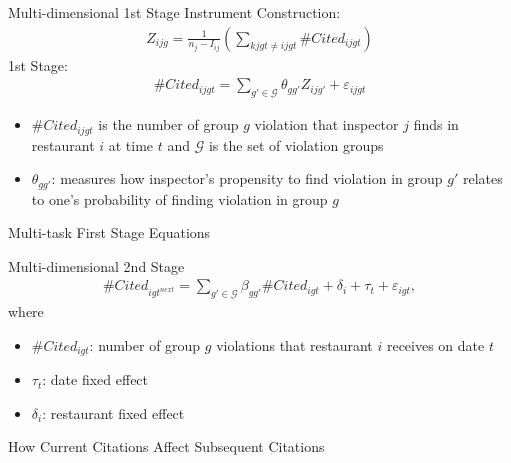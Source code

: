 \documentclass[handout]{beamer}
\begin{document}
\begin{frame}{Multi-dimensional 1st Stage}
    Instrument Construction:
    \begin{align*}
        Z_{ijg} = \frac{1}{n_j - I_{ij}} \left(\sum_{kjgt \neq ijgt} \# Cited_{ijgt}\right)
    \end{align*}
    \pause
    1st Stage:
    \begin{align*}
        \# Cited_{ijgt} = \sum_{g'\in \mathcal{G}} \theta_{gg'}Z_{ijg'} + \varepsilon_{ijgt} 
    \end{align*}
    \begin{itemize}
    \item $\# Cited_{ijgt}$ is the number of group $g$ violation that inspector $j$ finds in restaurant $i$ at time $t$ and $\mathcal{G}$ is the set of violation groups
    \item $\theta_{gg'}$: measures how inspector's propensity to find violation in group $g'$ relates to one's probability of finding violation in group $g$ 
    \end{itemize}
\end{frame}

\begin{frame}{Multi-task First Stage Equations}
\begin{table}[]
\scalebox{0.4}{
}
\end{table}
\end{frame}

\begin{frame}{Multi-dimensional 2nd Stage}
\begin{align*}
    \# Cited_{igt^{next}} = \sum_{g' \in \mathcal{G}} \beta_{gg'} \# Cited_{igt} + \delta_i + \tau_t + \varepsilon_{igt},
\end{align*}
where 
\begin{itemize}
\item $\# Cited_{igt}$: number of group $g$ violations that restaurant $i$ receives on date $t$
\item $\tau_t$: date fixed effect
\item $\delta_i$: restaurant fixed effect
\end{itemize}
\end{frame}
\begin{frame}{How Current Citations Affect Subsequent Citations}
\begin{table}[]
    \centering
    \scalebox{0.4}{
    }
\end{table}
\end{frame}
\end{document}
